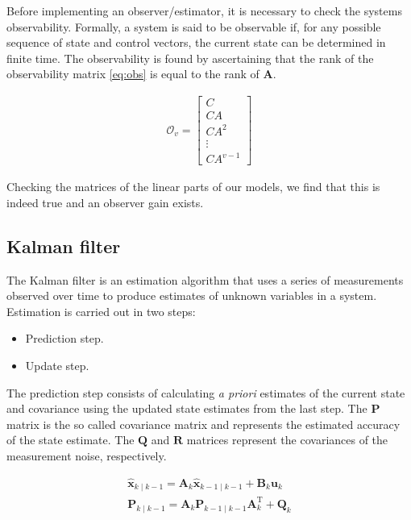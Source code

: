 Before implementing an observer/estimator, it is necessary to check the  systems observability.
Formally, a system is said to be observable if, for any possible sequence of state and control vectors, the current state can be determined in finite time.
The observability is found by ascertaining that the rank of the observability matrix \eqref{eq:obs} is equal to the rank of $\mathbf{A}$.

\begin{align}\label{eq:obs}
\mathcal{O}_v=\begin{bmatrix} C \\ CA \\ CA^2 \\ \vdots \\ CA^{v-1} \end{bmatrix}
\end{align}

Checking the matrices of the linear parts of our models, we find that this is indeed true and an observer gain exists.

\subsection{Kalman filter}
The Kalman filter is an estimation algorithm that uses a series of measurements observed over time to produce estimates of unknown variables in a system.
Estimation is carried out in two steps:

\begin{itemize}
\item Prediction step.
\item Update step.
\end{itemize} 

The prediction step consists of calculating \textit{a priori} estimates of the current state and covariance using the updated state estimates from the last step. %
The $\mathbf{P}$ matrix is the so called covariance matrix and represents the estimated accuracy of the state estimate.
The $\mathbf{Q}$ and $\mathbf{R}$ matrices represent the covariances of the measurement noise, respectively.

\begin{gather}
\hat{\mathbf{x}}_{k\mid k-1} = \mathbf{A}_{k}\hat{\mathbf{x}}_{k-1\mid k-1} + \mathbf{B}_{k} \mathbf{u}_{k} \\
\mathbf{P}_{k\mid k-1} =  \mathbf{A}_{k} \mathbf{P}_{k-1\mid k-1} \mathbf{A}_{k}^{\text{T}} + \mathbf{Q}_{k} 
\end{gather}


